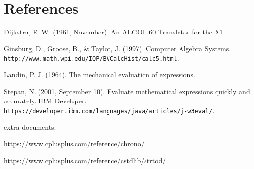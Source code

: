 \documentclass[11pt]{article}
\begin{document}
\noindent\makebox[\linewidth]{\rule{19.1cm}{0.4pt}}

\section*{References}
Dijkstra, E. W. (1961, November). An ALGOL 60 Translator for the X1.

Ginsburg, D., Groose, B., \& Taylor, J. (1997). Computer Algebra Systems.\\ \texttt{http://www.math.wpi.edu/IQP/BVCalcHist/calc5.html}.

Landin, P. J. (1964). The mechanical evaluation of expressions.

Stepan, N. (2001, September 10). Evaluate mathematical expressions quickly and accurately. IBM Developer.\\ \texttt{https://developer.ibm.com/languages/java/articles/j-w3eval/}.

extra documents:

https://www.cplusplus.com/reference/chrono/

https://www.cplusplus.com/reference/cstdlib/strtod/
\end{document}
